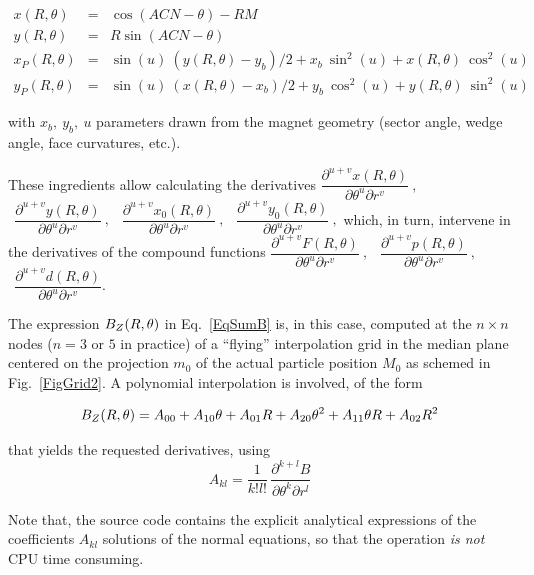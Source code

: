 {\begin{eqnarray}
x(R,\theta)&=&\cos (ACN-\theta)-RM   \nonumber \\[-1ex]
y(R,\theta)&=&R\sin (ACN-\theta)   \nonumber \\[-1ex]
x_P(R,\theta)&=&\sin(u)\:  (y(R,\theta) - y_b)/2 + x_b\:  \sin^2(u) + x(R,\theta)\:  \cos^2(u)   \nonumber \\[-1ex]
y_P(R,\theta)&=&\sin(u)\: (x(R,\theta) - x_b)/2 + y_b\:  \cos^2(u) + y(R,\theta) \: \sin^2(u)   \nonumber 
\end{eqnarray}

\noindent with $x_b,~y_b,~u$ parameters drawn from the  magnet geometry (sector angle, wedge angle, face curvatures, etc.). 

\noindent These ingredients allow calculating  the derivatives 
$\dfrac{\partial^{ u+v}x(R,\theta)}{ \partial \theta^u\partial r^v}\:,$ 
$\:\: \dfrac{\partial^{ u+v}y(R,\theta)}{ \partial \theta^u\partial r^v}\:,$ 
$\:\:\dfrac{\partial^{ u+v}x_0(R,\theta)}{ \partial \theta^u\partial r^v}\:,$ 
$\:\:\dfrac{\partial^{ u+v}y_0(R,\theta)}{ \partial \theta^u\partial r^v}\:,$ 
which, in turn,  intervene in the derivatives of the compound functions 
$\dfrac{\partial^{ u+v}F(R,\theta)}{ \partial \theta^u\partial r^v}\:,$ 
$\:\:\dfrac{\partial^{ u+v}p(R,\theta)}{ \partial \theta^u\partial r^v}\:,$ 
$\:\:\dfrac{\partial^{ u+v}d(R,\theta)}{ \partial \theta^u\partial r^v}$. 


\bigskip

\label{InterpMeth}

\bigskip

\noindent The expression ${B_Z}(R,\theta)$ in Eq.~\ref{EqSumB} is, in this case, 
computed at  the $n\times n$ nodes  ($n=3$ or $5$ in practice)  
of a ``flying'' interpolation grid in the median plane centered on the projection $m_0$ of 
the actual particle position $M_0$ as schemed 
in Fig.~\ref{FigGrid2}. A polynomial interpolation is involved, of the form 

$${B_Z}(R,\theta) = A_{00} + A_{10}\theta + A_{01}R + A_{20}\theta^2 + A_{11}\theta R + A_{02} R^2 $$

\noindent  that yields the requested   derivatives, using 
$$	A_{kl} = \dfrac{1 }{ k!l!}\,  \dfrac{\partial^{ k+l}B }{ \partial \theta^k\partial r^l} $$

\noindent Note that, the source code contains the explicit analytical 
expressions of the coefficients $A_{kl}$ solutions of the normal 
equations, so that the operation {\it is not}   CPU time consuming. 

}
